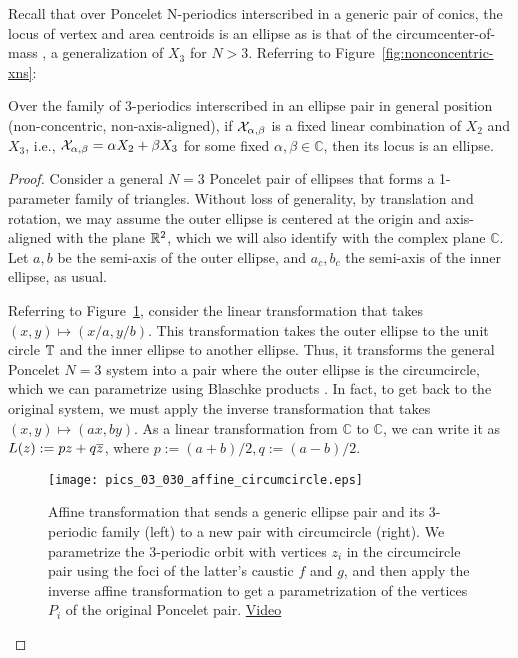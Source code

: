 Recall that over Poncelet N-periodics interscribed in a generic pair of conics, the locus of vertex and area centroids is an ellipse \cite{sergei2016-com} as is that of the circumcenter-of-mass \cite{sergei2014-circumcenter-of-mass}, a generalization of $X_3$ for $N>3$. Referring to Figure~\ref{fig:nonconcentric-xns}:

\begin{theorem}
Over the family of 3-periodics interscribed in an ellipse pair in general position (non-concentric, non-axis-aligned),
if $\mathcal{X}_{\alpha,\beta}$ is a fixed linear combination of $X_2$ and $X_3$, i.e., $\mathcal{X}_{\alpha,\beta}=\alpha X_2+\beta X_3$ for some fixed $\alpha,\beta\in\mathbb{C}$, then its locus is an ellipse. 
\label{thm:ellipse-locus}
\end{theorem}

\begin{proof}

Consider a general $N=3$ Poncelet pair of ellipses that forms a 1-parameter family of triangles. Without loss of generality, by translation and rotation, we may assume the outer ellipse is centered at the origin and axis-aligned with the plane $\mathbb{R}^2$, which we will also identify with the complex plane $\mathbb{C}$. Let $a,b$ be the semi-axis of the outer ellipse, and $a_c,b_c$ the semi-axis of the inner ellipse, as usual. 

Referring to Figure~\ref{fig:affine}, consider the linear transformation that takes $(x,y)\mapsto(x/a,y/b)$. This transformation takes the outer ellipse to the unit circle $\mathbb{T}$ and the inner ellipse to another ellipse. Thus, it transforms the general Poncelet $N=3$ system into a pair where the outer ellipse is the circumcircle, which we can parametrize using Blaschke products \cite{daepp-2019}. In fact, to get back to the original system, we must apply the inverse transformation that takes $(x,y)\mapsto(a x,b y)$. As a linear transformation from $\mathbb{C}$ to $\mathbb{C}$, we can write it as $L(z):=p z+q \overline{z}$, where $p:=(a+b)/2, q:=(a-b)/2$.

\begin{figure}
    \centering
    \texttt{[image: pics\_03\_030\_affine\_circumcircle.eps]}
    \caption{Affine transformation that sends a generic ellipse pair and its 3-periodic family (left) to a new pair with circumcircle (right). We parametrize the 3-periodic orbit with vertices $z_i$ in the circumcircle pair using the foci of the latter's caustic $f$ and $g$, and then apply the inverse affine transformation to get a parametrization of the vertices $P_i$ of the original Poncelet pair. \href{https://youtu.be/6xSFBLWIkTM}{Video}}
    \label{fig:affine}
\end{figure}



\end{proof}
